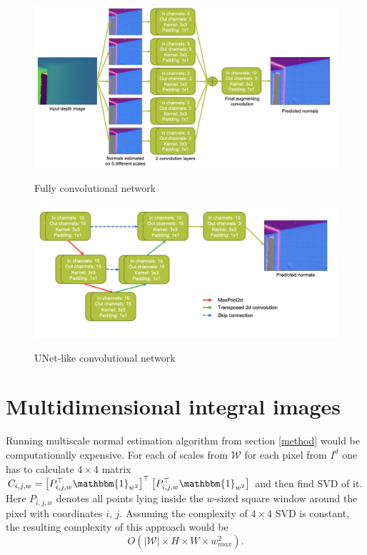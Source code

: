 \begin{figure}
\caption{Fully convolutional network}
\centering
\includegraphics[width=\textwidth]{images/Screen Shot 2020-05-27 at 7.47.52 PM.png}
\label{fig:fcn}
\end{figure}

\begin{figure}
\caption{UNet-like convolutional network}
\centering
\includegraphics[width=\textwidth]{images/Screen Shot 2020-05-27 at 7.51.30 PM.png}
\label{fig:unet}
\end{figure}

\section{Multidimensional integral images} \label{integ-im}

Running multiscale normal estimation algorithm from section \ref{method} would be computationally expensive. For each of scales from $\mathcal{W}$ for each pixel from $I^d$ one has to calculate $4 \times 4$ matrix $C_{i,j,w} = \left[P_{i,j,w}^\top \mathbbm{1}_{w^2} \right]^\top \left[P_{i,j,w}^\top \mathbbm{1}_{w^2} \right]$ and then find SVD of it. Here $P_{i,j,w}$ denotes all points lying inside the $w$-sized square window around the pixel with coordinates $i$, $j$. Assuming the complexity of $4  \times 4$ SVD is constant, the resulting complexity of this approach would be 
\[
O\left(\left|\mathcal{W}\right| \times H \times W \times w_{max} ^ 2\right).
\]

